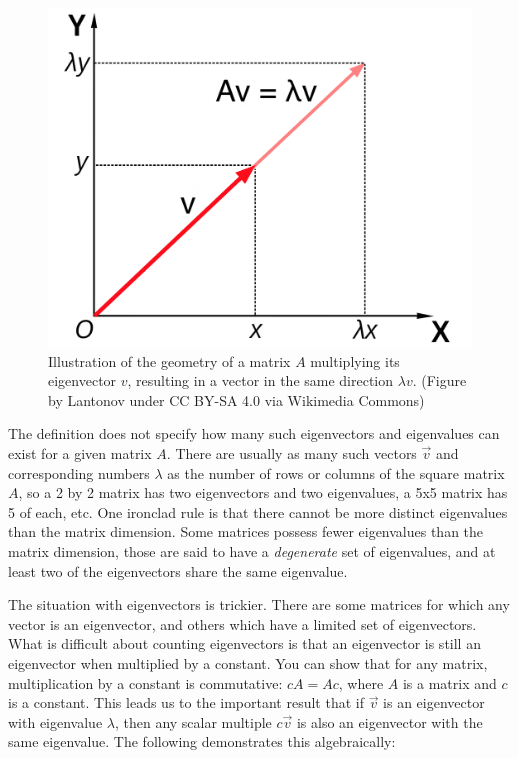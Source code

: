 \documentclass[
  letterpaper,
  DIV=11,
  numbers=noendperiod]{scrreprt}
\begin{document}
\begin{figure}

{\centering \includegraphics{./images/Eigenvalue_equation.png}

}

\caption{Illustration of the geometry of a matrix \(A\) multiplying its
eigenvector \(v\), resulting in a vector in the same direction
\(\lambda v\). (Figure by Lantonov under CC BY-SA 4.0 via Wikimedia
Commons)}

\end{figure}

The definition does not specify how many such eigenvectors and
eigenvalues can exist for a given matrix \(A\). There are usually as
many such vectors \(\vec v\) and corresponding numbers \(\lambda\) as
the number of rows or columns of the square matrix \(A\), so a 2 by 2
matrix has two eigenvectors and two eigenvalues, a 5x5 matrix has 5 of
each, etc. One ironclad rule is that there cannot be more distinct
eigenvalues than the matrix dimension. Some matrices possess fewer
eigenvalues than the matrix dimension, those are said to have a
\emph{degenerate} set of eigenvalues, and at least two of the
eigenvectors share the same eigenvalue.

The situation with eigenvectors is trickier. There are some matrices for
which any vector is an eigenvector, and others which have a limited set
of eigenvectors. What is difficult about counting eigenvectors is that
an eigenvector is still an eigenvector when multiplied by a constant.
You can show that for any matrix, multiplication by a constant is
commutative: \(cA = Ac\), where \(A\) is a matrix and \(c\) is a
constant. This leads us to the important result that if \(\vec v\) is an
eigenvector with eigenvalue \(\lambda\), then any scalar multiple
\(c \vec v\) is also an eigenvector with the same eigenvalue. The
following demonstrates this algebraically:
\end{document}
